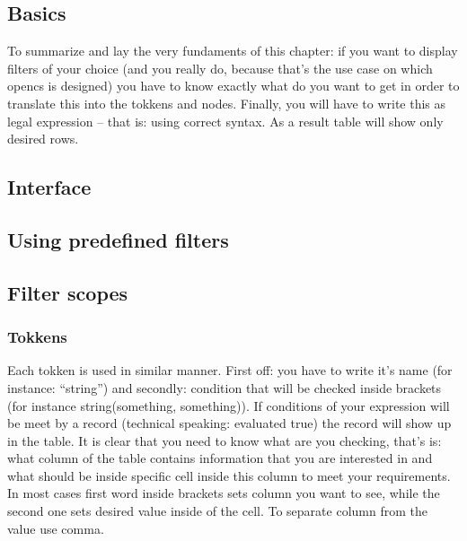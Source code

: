 \subsection{Basics}
To summarize and lay the very fundaments of this chapter: if you want to display filters of your choice (and you really do, because that's the use case on which opencs is designed) you have to know exactly what do you want to get in order to translate this into the tokkens and nodes. Finally, you will have to write this as legal expression -- that is: using correct syntax. As a result table will show only desired rows.

\subsection{Interface}

\subsection{Using predefined filters}

\subsection{Filter scopes}

\subsubsection{Tokkens}
Each tokken is used in similar manner. First off: you have to write it's name (for instance: ``string'') and secondly: condition that will be checked inside brackets (for instance string(something, something)). If conditions of your expression will be meet by a record (technical speaking: evaluated true) the record will show up in the table.
\linebreak
It is clear that you need to know what are you checking, that's is: what column of the table contains information that you are interested in and what should be inside specific cell inside this column to meet your requirements. In most cases first word inside brackets sets column you want to see, while the second one sets desired value inside of the cell. To separate column from the value use comma.  

